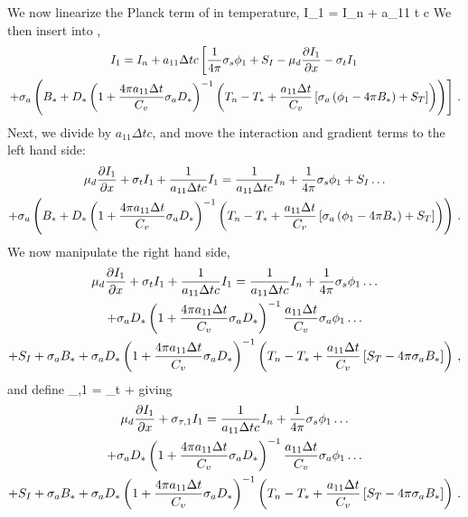We now linearize the Planck term of  in temperature,
\benum
I_1 = I_n + a_{11} \Delta t c  \pep
\label{eq:long_i_1_analytic}
\eenum
We then insert  into ,
\begin{multline}
I_1 = I_n + a_{11} \Delta t c \left[ \frac{1}{4\pi}\sigma_{s} \phi_1 + S_I - \mu_d \frac{\partial I_1}{\partial x} - \sigma_t I_1  \right. \\ 
\left. + \sigma_a \left(B_* + D_*\left(1 + \frac{4\pi a_{11} \Delta t}{C_v} \sigma_a D_*  \right)^{-1} \left( T_n - T_* + \frac{a_{11} \Delta t }{C_v} \left[ \sigma_a \left( \phi_1 - 4\pi   B_* \right) + S_T \right]  \right) \right) \right] \, .
\end{multline}
Next, we divide by $ a_{11} \Delta t c$, and move the interaction and gradient terms to the left hand side:
\begin{multline}
\mu_d \frac{\partial I_1}{\partial x} + \sigma_t I_1 + \frac{1}{a_{11} \Delta t c} I_1 = \frac{1}{a_{11} \Delta t c}I_n + \frac{1}{4\pi}\sigma_{s} \phi_1 + S_I \dots \\
+ \sigma_a \left(B_* + D_*\left(1 + \frac{4\pi a_{11} \Delta t}{C_v} \sigma_a D_*  \right)^{-1} \left( T_n - T_* + \frac{a_{11} \Delta t }{C_v} \left[ \sigma_a \left( \phi_1 - 4\pi   B_* \right) + S_T \right]  \right) \right) \, .
\end{multline}
We now manipulate the right hand side,
\begin{multline}
\mu_d \frac{\partial I_1}{\partial x} + \sigma_t I_1 + \frac{1}{a_{11} \Delta t c} I_1 = \frac{1}{a_{11} \Delta t c}I_n + \frac{1}{4\pi}\sigma_{s} \phi_1  \dots \\ 
+  \sigma_a  D_*\left(1 + \frac{4\pi a_{11} \Delta t}{C_v} \sigma_a D_*  \right)^{-1} \frac{a_{11} \Delta t }{C_v} \sigma_a \phi_1  \dots \\
+ S_I + \sigma_a B_* 
+ \sigma_a D_*\left(1 + \frac{4\pi a_{11} \Delta t}{C_v} \sigma_a D_*  \right)^{-1} \left( T_n - T_* + \frac{a_{11} \Delta t }{C_v} \left[  S_T - 4\pi \sigma_a   B_*\right]  \right) \, ,
\end{multline}
and define
\benum
\sigma_{\tau,1} = \sigma_t +  \pec
\label{eq:tau_1_analytic}
\eenum
giving
\begin{multline}
\mu_d \frac{\partial I_1}{\partial x} + \sigma_{\tau,1} I_1 = \frac{1}{a_{11} \Delta t c}I_n + \frac{1}{4\pi}\sigma_{s} \phi_1  \dots \\ 
+  \sigma_a  D_*\left(1 + \frac{4\pi a_{11} \Delta t}{C_v} \sigma_a D_*  \right)^{-1} \frac{a_{11} \Delta t }{C_v} \sigma_a \phi_1  \dots \\
+ S_I + \sigma_a B_* 
+ \sigma_a D_*\left(1 + \frac{4\pi a_{11} \Delta t}{C_v} \sigma_a D_*  \right)^{-1} \left( T_n - T_* + \frac{a_{11} \Delta t }{C_v} \left[  S_T - 4\pi \sigma_a   B_*\right]  \right) \, .
\end{multline}
